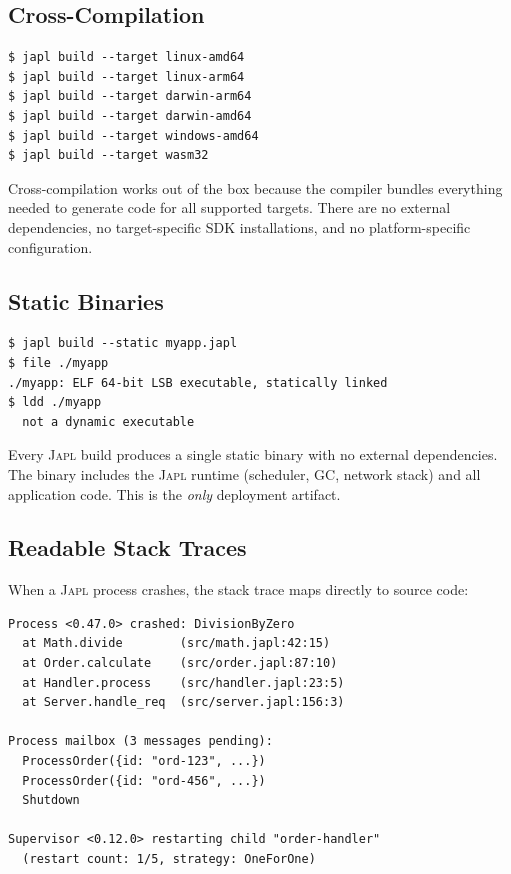 \documentclass[11pt,twocolumn]{article}
\newcommand{\japl}{\textsc{Japl}}
\begin{document}
\subsection{Cross-Compilation}

\begin{lstlisting}[language=shell]
$ japl build --target linux-amd64
$ japl build --target linux-arm64
$ japl build --target darwin-arm64
$ japl build --target darwin-amd64
$ japl build --target windows-amd64
$ japl build --target wasm32
\end{lstlisting}

Cross-compilation works out of the box because the compiler bundles everything needed to generate code for all supported targets.
There are no external dependencies, no target-specific SDK installations, and no platform-specific configuration.

\subsection{Static Binaries}

\begin{lstlisting}[language=shell]
$ japl build --static myapp.japl
$ file ./myapp
./myapp: ELF 64-bit LSB executable, statically linked
$ ldd ./myapp
  not a dynamic executable
\end{lstlisting}

Every \japl{} build produces a single static binary with no external dependencies.
The binary includes the \japl{} runtime (scheduler, GC, network stack) and all application code.
This is the \emph{only} deployment artifact.

\subsection{Readable Stack Traces}

When a \japl{} process crashes, the stack trace maps directly to source code:

\begin{lstlisting}[language=shell,basicstyle=\ttfamily\tiny]
Process <0.47.0> crashed: DivisionByZero
  at Math.divide        (src/math.japl:42:15)
  at Order.calculate    (src/order.japl:87:10)
  at Handler.process    (src/handler.japl:23:5)
  at Server.handle_req  (src/server.japl:156:3)

Process mailbox (3 messages pending):
  ProcessOrder({id: "ord-123", ...})
  ProcessOrder({id: "ord-456", ...})
  Shutdown

Supervisor <0.12.0> restarting child "order-handler"
  (restart count: 1/5, strategy: OneForOne)
\end{lstlisting}
\end{document}
